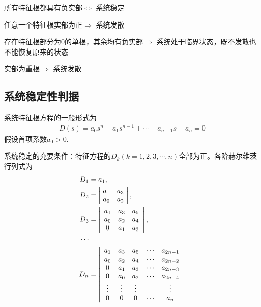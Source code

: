 \theorem[系统稳定的充要条件]
\begin{myitemize}
	\item 所有特征根都具有负实部$\Longleftrightarrow$ 系统稳定
	\item 任意一个特征根实部为正$\Longrightarrow$ 系统发散
	\item 存在特征根部分为0的单根，其余均有负实部$\Longrightarrow$ 系统处于临界状态，既不发散也不能恢复原来的状态
	\item 实部为重根$\Longrightarrow$ 系统发散\vspace*{0.3em}
\end{myitemize}

\subsection{系统稳定性判据}
系统特征根方程的一般形式为
\begin{align*}
	D(s) = a_0 s^n + a_1 s^{n-1} + \cdots + a_{n-1}s + a_n =0
\end{align*}
假设首项系数$a_0>0$.

系统稳定的充要条件：特征方程的$D_k(k = 1,2,3,\cdots,n)$全部为正。各阶赫尔维茨行列式为
\begin{align}
	D_1 &= a_1, \notag \\
	D_2 &= 
	\begin{vmatrix}
		\,\, a_1 & a_3 \,\,\\
		\,\, a_0 & a_2 \,\,
	\end{vmatrix},\notag \\
	D_3 &= 
	\begin{vmatrix}
		\,\,\, a_1 & a_3 & a_5\,\,\,\\
		\,\,\, a_0 & a_2 & a_4\,\,\,\\
		\,\,\, 0 & a_1 & a_3 \,\,\,
	\end{vmatrix},\notag\\
	\cdots \notag \\
D_n &= 
\begin{vmatrix}
	\,\,\, a_1 & a_3 & a_5 & \cdots & a_{2n-1}\,\,\,\\
	\,\,\, a_0 & a_2 & a_4 & \cdots & a_{2n-2}\,\,\,\\
	\,\,\, 0 & a_1 & a_3 & \cdots & a_{2n-3}\,\,\,\\
	\,\,\, 0 & a_0 & a_2 & \cdots & a_{2n-4}\,\,\,\\
	\,\,\, \vdots & \vdots & \vdots & & \vdots\,\,\,\\
	\,\,\, 0 & 0 & 0& \cdots & a_n\,\,\,
\end{vmatrix}
\end{align}

